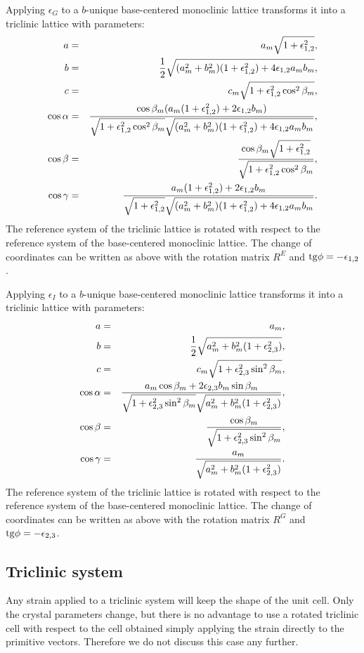 \documentclass[12pt,a4paper]{article}
\begin{document}
Applying $\epsilon_G$ to a $b$-unique base-centered monoclinic lattice 
transforms it into a triclinic lattice with parameters:
\begin{eqnarray}
a&=&a_m \sqrt{1+\epsilon_{1,2}^2}, \\
b&=&{1\over 2} \sqrt{(a_m^2+b_m^2)(1+\epsilon_{1,2}^2)+4\epsilon_{1,2}a_mb_m},\\
c&=&c_m \sqrt{1+\epsilon_{1,2}^2 \cos^2\beta_m}, \\
\cos\alpha &=& {\cos\beta_m (a_m (1+\epsilon_{1,2}^2)+2\epsilon_{1,2}b_m) 
\over 
\sqrt{1+\epsilon_{1,2}^2 \cos^2\beta_m} \sqrt{(a_m^2+b_m^2)(1+\epsilon_{1,2}^2)+4\epsilon_{1,2}a_mb_m}}, \\
\cos\beta &=& {\cos\beta_m \sqrt{1+\epsilon_{1,2}^2} \over
\sqrt{1+\epsilon_{1,2}^2 \cos^2\beta_m}}, \\
\cos\gamma &=& {a_m (1+\epsilon_{1,2}^2)+2\epsilon_{1,2}b_m 
\over 
\sqrt{1+\epsilon_{1,2}^2} \sqrt{(a_m^2+b_m^2)(1+\epsilon_{1,2}^2)+4\epsilon_{1,2}a_mb_m}}.
\end{eqnarray}
The reference system of the triclinic lattice is rotated 
with respect to the reference system of the base-centered
monoclinic lattice. 
The change of coordinates can be written as above with the rotation matrix 
$R^E$ and ${\rm tg}\phi=-\epsilon_{1,2}$.

Applying $\epsilon_I$ to a $b$-unique base-centered monoclinic lattice 
transforms it into a triclinic lattice with parameters:
\begin{eqnarray}
a&=&a_m, \\
b&=&{1\over 2} \sqrt{a_m^2+b_m^2(1+\epsilon_{2,3}^2)},\\
c&=&c_m \sqrt{1+\epsilon_{2,3}^2 \sin^2\beta_m}, \\
\cos\alpha &=& {a_m\cos\beta_m +2\epsilon_{2,3}b_m \sin \beta_m 
\over 
\sqrt{1+\epsilon_{2,3}^2 \sin^2\beta_m} 
\sqrt{a_m^2+b_m^2(1+\epsilon_{2,3}^2)}}, \\
\cos\beta &=& {\cos\beta_m \over
\sqrt{1+\epsilon_{2,3}^2 \sin^2\beta_m}}, \\
\cos\gamma &=& {a_m  
\over 
\sqrt{a_m^2+b_m^2(1+\epsilon_{2,3}^2)}}.
\end{eqnarray}
The reference system of the triclinic lattice is rotated 
with respect to the reference system of the base-centered
monoclinic lattice. 
The change of coordinates can be written as above with the rotation matrix 
$R^G$ and ${\rm tg}\phi=-\epsilon_{2,3}$.

\subsection{\color{web-blue}Triclinic system}
Any strain applied to a triclinic system will keep the shape of the
unit cell. Only the crystal parameters change, but there is no advantage
to use a rotated triclinic cell with respect to the cell obtained
simply applying the strain directly to the primitive vectors. Therefore
we do not discuss this case any further.
\end{document}
